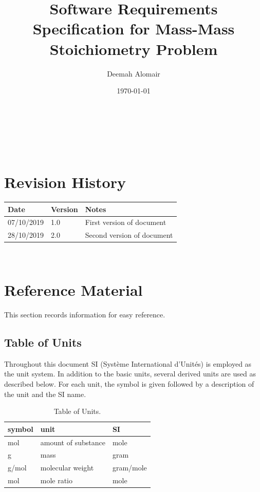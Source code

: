 \documentclass[12pt]{article}
\begin{document}
\title{Software Requirements Specification for Mass-Mass Stoichiometry Problem} 
\author{Deemah Alomair}
\date{\today}
	
\maketitle

~\newpage


\tableofcontents

~\newpage

\section*{Revision History}

\begin{tabularx}{\textwidth}{p{3cm}p{2cm}X}
\toprule {\bf Date} & {\bf Version} & {\bf Notes}\\
\midrule
07/10/2019 & 1.0 &  First version of document\\
28/10/2019 & 2.0 &  Second version of document\\
\bottomrule
\end{tabularx}

~\newpage

\section{Reference Material}

This section records information for easy reference.

\subsection{Table of Units}

Throughout this document SI (Syst\`{e}me International d'Unit\'{e}s) is employed
as the unit system.  In addition to the basic units, several derived units are
used as described below.  For each unit, the symbol is given followed by a
description of the unit and the SI name.
~\newline

\renewcommand{\arraystretch}{1.2}
\begin{table}[ht]
  \noindent \begin{tabular}{l l l} 
    \toprule		
    \textbf{symbol} & \textbf{unit} & \textbf{SI}\\
    \midrule 
    \si{\mol} & amount of substance & mole\\
    \si{\gram} & mass	& gram\\
    \si{\gram / \mol} & molecular weight & gram/mole \\
    \si{\mol} & mole ratio & mole\\
       \bottomrule
       \hline
  \end{tabular}  
\caption{Table of Units. }

   \end{table}
  
\end{document}
